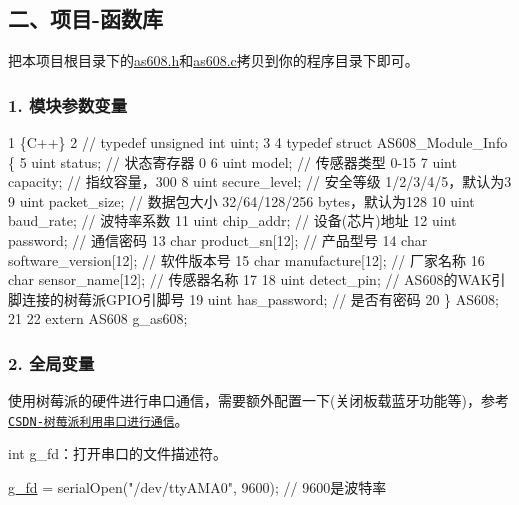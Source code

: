 \subsection*{二、项目-\/函数库}

把本项目根目录下的{\ttfamily \hyperlink{as608_8h}{as608.\+h}}和{\ttfamily \hyperlink{as608_8c}{as608.\+c}}拷贝到你的程序目录下即可。

\subsubsection*{1. 模块参数变量}


\begin{DoxyCode}
1 \{C++\}
2 // typedef unsigned int uint;
3 
4 typedef struct AS608\_Module\_Info \{
5   uint status;      // 状态寄存器 0
6   uint model;       // 传感器类型 0-15
7   uint capacity;    // 指纹容量，300
8   uint secure\_level;    // 安全等级 1/2/3/4/5，默认为3
9   uint packet\_size;     // 数据包大小 32/64/128/256 bytes，默认为128
10   uint baud\_rate;       // 波特率系数 
11   uint chip\_addr;       // 设备(芯片)地址                  
12   uint password;        // 通信密码
13   char product\_sn[12];        // 产品型号
14   char software\_version[12];  // 软件版本号
15   char manufacture[12];       // 厂家名称
16   char sensor\_name[12];       // 传感器名称
17 
18   uint detect\_pin;      // AS608的WAK引脚连接的树莓派GPIO引脚号
19   uint has\_password;    // 是否有密码
20 \} AS608;
21 
22 extern AS608 g\_as608;
\end{DoxyCode}


\subsubsection*{2. 全局变量}

使用树莓派的硬件进行串口通信，需要额外配置一下(关闭板载蓝牙功能等)，参考 \href{https://blog.csdn.net/guet_gjl/article/details/85164072}{\tt C\+S\+D\+N-\/树莓派利用串口进行通信}。


\begin{DoxyItemize}
\item {\ttfamily int g\+\_\+fd}：打开串口的文件描述符。
\end{DoxyItemize}


\begin{DoxyCode}
\hyperlink{as608_8c_ac09e95a250275ca69c109f7bbadfef43}{g\_fd} = serialOpen(\textcolor{stringliteral}{"/dev/ttyAMA0"}, 9600);  \textcolor{comment}{// 9600是波特率}
\end{DoxyCode}




